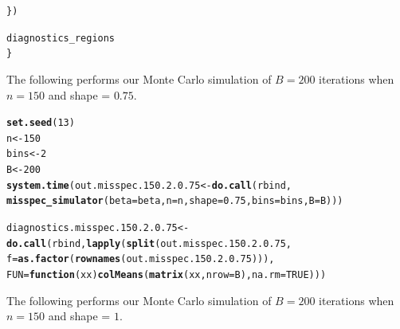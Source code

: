 \documentclass[11pt]{article}\usepackage[]{graphicx}\usepackage[]{color}
\makeatletter
\newcommand{\hlnum}[1]{\textcolor[rgb]{0.686,0.059,0.569}{#1}}%
\newcommand{\hlstd}[1]{\textcolor[rgb]{0.345,0.345,0.345}{#1}}%
\newcommand{\hlkwa}[1]{\textcolor[rgb]{0.161,0.373,0.58}{\textbf{#1}}}%
\newcommand{\hlkwb}[1]{\textcolor[rgb]{0.69,0.353,0.396}{#1}}%
\newcommand{\hlkwc}[1]{\textcolor[rgb]{0.333,0.667,0.333}{#1}}%
\newcommand{\hlkwd}[1]{\textcolor[rgb]{0.737,0.353,0.396}{\textbf{#1}}}%
\newenvironment{kframe}{%
 \def\at@end@of@kframe{}%
 \ifinner\ifhmode%
  \def\at@end@of@kframe{\end{minipage}}%
  \begin{minipage}{\columnwidth}%
 \fi\fi%
 \def\FrameCommand##1{\hskip\@totalleftmargin \hskip-\fboxsep
 \colorbox{shadecolor}{##1}\hskip-\fboxsep
     \hskip-\linewidth \hskip-\@totalleftmargin \hskip\columnwidth}%
 \MakeFramed {\advance\hsize-\width
   \@totalleftmargin\z@ \linewidth\hsize
   \@setminipage}}%
 {\par\unskip\endMakeFramed%
 \at@end@of@kframe}
\newenvironment{knitrout}{}{} %
\makeatother
\begin{document}
\begin{knitrout}
\begin{kframe}
\begin{alltt}
  \hlstd{\})}

  \hlstd{diagnostics_regions}
\hlstd{\}}
\end{alltt}
\end{kframe}
\end{knitrout}



The following performs our Monte Carlo simulation of $B = 200$ iterations 
when $n = 150$ and shape = $0.75$.

\begin{knitrout}
\color{fgcolor}\begin{kframe}
\begin{alltt}
\hlkwd{set.seed}\hlstd{(}\hlnum{13}\hlstd{)}
\hlstd{n} \hlkwb{<-} \hlnum{150}
\hlstd{bins} \hlkwb{<-} \hlnum{2}
\hlstd{B} \hlkwb{<-} \hlnum{200}
\hlkwd{system.time}\hlstd{(out.misspec.150.2.0.75} \hlkwb{<-} \hlkwd{do.call}\hlstd{(rbind,}
  \hlkwd{misspec_simulator}\hlstd{(}\hlkwc{beta} \hlstd{= beta,} \hlkwc{n} \hlstd{= n,} \hlkwc{shape} \hlstd{=} \hlnum{0.75}\hlstd{,} \hlkwc{bins} \hlstd{= bins,} \hlkwc{B} \hlstd{= B)))}
\end{alltt}


{\ttfamily\noindent\bfseries\color{errorcolor}{\#\# Error in chol.default(crossprod(x) + lambda[j] * diag(v)): the leading minor of order 5 is not positive definite}}

{\ttfamily\noindent\itshape\color{messagecolor}{\#\# Timing stopped at: 0.887 0.004 0.892}}\begin{alltt}
\hlstd{diagnostics.misspec.150.2.0.75} \hlkwb{<-} \hlkwd{do.call}\hlstd{(rbind,} \hlkwd{lapply}\hlstd{(}\hlkwd{split}\hlstd{(out.misspec.150.2.0.75,}
  \hlkwc{f} \hlstd{=} \hlkwd{as.factor}\hlstd{(}\hlkwd{rownames}\hlstd{(out.misspec.150.2.0.75))),}
  \hlkwc{FUN} \hlstd{=} \hlkwa{function}\hlstd{(}\hlkwc{xx}\hlstd{)} \hlkwd{colMeans}\hlstd{(}\hlkwd{matrix}\hlstd{(xx,} \hlkwc{nrow} \hlstd{= B),} \hlkwc{na.rm} \hlstd{=} \hlnum{TRUE}\hlstd{)))}
\end{alltt}


{\ttfamily\noindent\bfseries\color{errorcolor}{\#\# Error in split(out.misspec.150.2.0.75, f = as.factor(rownames(out.misspec.150.2.0.75))): object 'out.misspec.150.2.0.75' not found}}\end{kframe}
\end{knitrout}


The following performs our Monte Carlo simulation of $B = 200$ iterations 
when $n = 150$ and shape = $1$.
\end{document}
